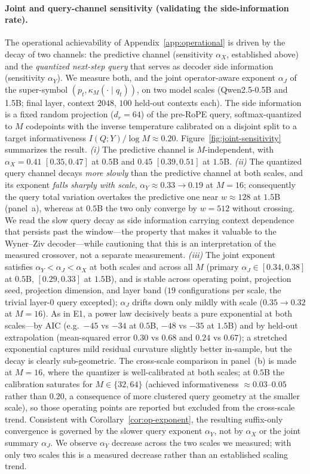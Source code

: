 \documentclass[11pt]{article}
\theoremstyle{plain}
\theoremstyle{definition}
\theoremstyle{remark}
\begin{document}
\paragraph{Joint and query-channel sensitivity (validating the side-information rate).}
The operational achievability of Appendix~\ref{app:operational} is
driven by the decay of two channels: the predictive channel
(sensitivity $\alpha_X$, established above) and the \emph{quantized
next-step query} that serves as decoder side information (sensitivity
$\alpha_Y$). We measure both, and the joint operator-aware exponent
$\alpha_J$ of the super-symbol $(p_t, \kappa_M(\cdot\mid q_t))$, on two
model scales (Qwen2.5-0.5B and 1.5B; final layer, context $2048$,
$100$ held-out contexts each). The side information is a fixed random
projection ($d_r{=}64$) of the pre-RoPE query, softmax-quantized to
$M$ codepoints with the inverse temperature calibrated on a disjoint
split to a target informativeness $I(Q;Y)/\log M \approx 0.20$.
Figure~\ref{fig:joint-sensitivity} summarizes the result. \emph{(i)}
The predictive channel is $M$-independent, with $\alpha_X=0.41$
$[0.35,0.47]$ at $0.5$B and $0.45$ $[0.39,0.51]$ at $1.5$B.
\emph{(ii)} The quantized query channel decays \emph{more slowly} than
the predictive channel at both scales, and its exponent \emph{falls
sharply with scale}, $\alpha_Y\approx0.33\to0.19$ at $M{=}16$;
consequently the query total variation overtakes the predictive one
near $w\approx128$ at $1.5$B (panel~a), whereas at $0.5$B the two only
converge by $w{=}512$ without crossing. We read the slow query decay
as side information carrying context dependence that persists past the
window---the property that makes it valuable to the Wyner--Ziv
decoder---while cautioning that this is an interpretation of the
measured crossover, not a separate measurement. \emph{(iii)} The joint
exponent satisfies $\alpha_Y<\alpha_J<\alpha_X$ at both scales and
across all $M$ (primary $\alpha_J\in[0.34,0.38]$ at $0.5$B,
$[0.29,0.33]$ at $1.5$B), and is stable across operating point,
projection seed, projection dimension, and layer band ($19$
configurations per scale, the trivial layer-$0$ query excepted);
$\alpha_J$ drifts down only mildly with scale ($0.35\to0.32$ at
$M{=}16$). As in E1, a power law decisively beats a pure exponential
at both scales---by AIC (e.g.\ $-45$ vs $-34$ at $0.5$B, $-48$ vs
$-35$ at $1.5$B) and by held-out extrapolation (mean-squared error
$0.30$ vs $0.68$ and $0.24$ vs $0.67$); a stretched exponential
captures mild residual curvature slightly better in-sample, but the
decay is clearly sub-geometric. The cross-scale comparison in
panel~(b) is made at $M{=}16$, where the quantizer is well-calibrated
at both scales; at $0.5$B the calibration saturates for
$M\in\{32,64\}$ (achieved informativeness $\approx0.03$--$0.05$ rather
than $0.20$, a consequence of more clustered query geometry at the
smaller scale), so those operating points are reported but excluded
from the cross-scale trend. Consistent with
Corollary~\ref{cor:op-exponent}, the resulting suffix-only convergence
is governed by the slower query exponent $\alpha_Y$, not by
$\alpha_X$ or the joint summary $\alpha_J$. We observe $\alpha_Y$
decrease across the two scales we measured; with only two scales this
is a measured decrease rather than an established scaling trend.
\end{document}

